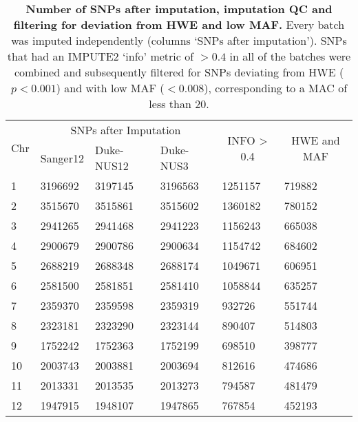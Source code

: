 \begin{table}[htbp]
  \centering
  \caption[\textbf{Number of SNPs after imputation, imputation QC and filtering for deviation from HWE and low MAF. }]{\textbf{Number of SNPs after imputation, imputation QC and filtering for deviation from HWE and low MAF. } Every batch was imputed independently (columns `SNPs after imputation'). SNPs that had an IMPUTE2 `info' metric of \(> 0.4\) in all of the batches were combined and subsequently filtered for SNPs deviating from HWE (\(p <0.001\)) and with low MAF (\(< 0.008\)), corresponding to a MAC of less than \num{20}. }
    \begin{tabular}{llllll}
    \toprule
    \multicolumn{1}{c}{\multirow{2}[4]{*}{Chr}} & \multicolumn{3}{c}{SNPs after Imputation} & \multicolumn{1}{c}{\multirow{2}[4]{*}{ INFO > 0.4}} & \multicolumn{1}{c}{\multirow{2}[4]{*}{HWE and MAF}} \\
\cmidrule{2-4}          & Sanger12 & Duke-NUS12 & Duke-NUS3 &       &  \\
    \midrule
    \num{1} & \num{3196692} & \num{3197145} & \num{3196563} & \num{1251157} & \num{719882} \\
    \num{2} & \num{3515670} & \num{3515861} & \num{3515602} & \num{1360182} & \num{780152} \\
    \num{3} & \num{2941265} & \num{2941468} & \num{2941223} & \num{1156243} & \num{665038} \\
    \num{4} & \num{2900679} & \num{2900786} & \num{2900634} & \num{1154742} & \num{684602} \\
    \num{5} & \num{2688219} & \num{2688348} & \num{2688174} & \num{1049671} & \num{606951} \\
    \num{6} & \num{2581500} & \num{2581851} & \num{2581410} & \num{1058844} & \num{635257} \\
    \num{7} & \num{2359370} & \num{2359598} & \num{2359319} & \num{932726} & \num{551744} \\
    \num{8} & \num{2323181} & \num{2323290} & \num{2323144} & \num{890407} & \num{514803} \\
    \num{9} & \num{1752242} & \num{1752363} & \num{1752199} & \num{698510} & \num{398777} \\
    \num{10} & \num{2003743} & \num{2003881} & \num{2003694} & \num{812616} & \num{474686} \\
    \num{11} & \num{2013331} & \num{2013535} & \num{2013273} & \num{794587} & \num{481479} \\
    \num{12} & \num{1947915} & \num{1948107} & \num{1947865} & \num{767854} & \num{452193} \\

\end{tabular}
\end{table}
